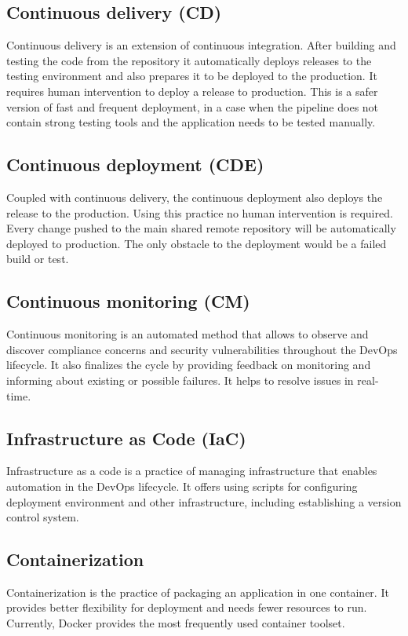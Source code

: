 \subsection{Continuous delivery (CD)} Continuous delivery is an extension of continuous integration. After building and testing the code from the repository it automatically deploys releases to the testing environment and also prepares it to be deployed to the production. It requires human intervention to deploy a release to production. This is a safer version of fast and frequent deployment, in a case when the pipeline does not contain strong testing tools and the application needs to be tested manually.

\subsection{Continuous deployment (CDE)} Coupled with continuous delivery, the continuous deployment also deploys the release to the production. Using this practice no human intervention is required. Every change pushed to the main shared remote repository will be automatically deployed to production. The only obstacle to the deployment would be a failed build or test.

\subsection{Continuous monitoring (CM)} Continuous monitoring is an automated method that allows to observe and discover compliance concerns and security vulnerabilities throughout the DevOps lifecycle. It also finalizes the cycle by providing feedback on monitoring and informing about existing or possible failures. It helps to resolve issues in real-time.

\subsection{Infrastructure as Code (IaC)} Infrastructure as a code is a practice of managing infrastructure that enables automation in the DevOps lifecycle. It offers using scripts for configuring deployment environment and other infrastructure, including establishing a version control system.

\subsection{Containerization} Containerization is the practice of packaging an application in one container. It provides better flexibility for deployment and needs fewer resources to run. Currently, Docker provides the most frequently used container toolset.

